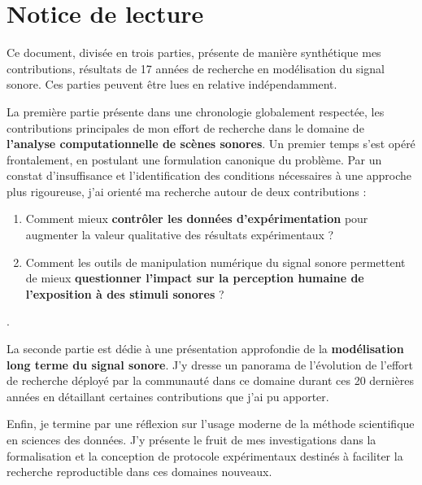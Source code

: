 \chapter{\nmu Notice \nmu de lecture} \label{chap:notice}

Ce document, divisée en trois parties, présente de manière synthétique mes contributions, résultats de 17 années de recherche en modélisation du signal sonore. Ces parties peuvent être lues en relative indépendamment.

La première partie présente dans une chronologie globalement respectée, les contributions principales de mon effort de recherche dans le domaine de \textbf{l'analyse computationnelle de scènes sonores}. Un premier temps s'est opéré frontalement, en postulant une formulation canonique du problème. Par un constat d'insuffisance et l'identification des conditions nécessaires à une approche plus rigoureuse, j'ai orienté ma recherche autour de deux contributions :
\begin{enumerate}
  \item Comment mieux \textbf{contrôler les données d'expérimentation} pour augmenter la valeur qualitative des résultats expérimentaux ?
  \item Comment les outils de manipulation numérique du signal sonore permettent de mieux \textbf{questionner l'impact sur la perception humaine de l'exposition à des stimuli sonores} ?
\end{enumerate}.

La seconde partie est dédie à une présentation approfondie de la \textbf{modélisation long terme du signal sonore}. J'y dresse un panorama de l'évolution de l'effort de recherche déployé par la communauté dans ce domaine durant ces 20 dernières années en détaillant certaines contributions que j'ai pu apporter.

Enfin, je termine par une réflexion sur l'usage moderne de la méthode scientifique en sciences des données. J'y présente le fruit de mes investigations dans la formalisation et la conception de protocole expérimentaux destinés à faciliter la recherche reproductible dans ces domaines nouveaux.

